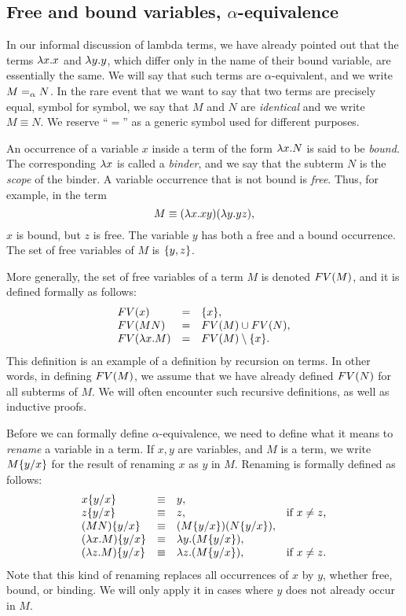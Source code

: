 \documentclass{article}
\begin{document}
\subsection{Free and bound variables, $\alpha$-equivalence}

In our informal discussion of lambda terms, we have already pointed
out that the terms $\lambda x.x$ and $\lambda y.y$, which differ only in the
name of their bound variable, are essentially the same. We will say
that such terms are $\alpha$-equivalent, and we write $M=_{\alpha} N$.  In
the rare event that we want to say that two terms are precisely equal,
symbol for symbol, we say that $M$ and $N$ are {\em identical} and we
write $M\equiv N$. We reserve ``$=$'' as a generic symbol used for
different purposes.

An occurrence of a variable $x$ inside a term of the form $\lambda x.N$
is said to be {\em bound}. The corresponding $\lambda x$ is called a {\em
  binder}, and we say that the subterm $N$ is the {\em scope} of the
binder. A variable occurrence that is not bound is {\em free}.  Thus,
for example, in the term
\[   M \equiv (\lambda x.xy)(\lambda y.yz), \]
$x$ is bound, but $z$ is free. The variable $y$ has both a free and a
bound occurrence. The set of free variables of $M$ is $\{y,z\}$. 

More generally, the set of free variables of a term $M$ is denoted
$FV(M)$, and it is defined formally as follows:
\[ \begin{array}{lll}
  FV(x) &=& \{x\}, \\
  FV(MN) &=& FV(M)\cup FV(N), \\
  FV(\lambda x.M) &=& FV(M) \setminus \{x\}.
\end{array}
\]
This definition is an example of a definition by recursion on
terms. In other words, in defining $FV(M)$, we assume that we have
already defined $FV(N)$ for all subterms of $M$. We will often
encounter such recursive definitions, as well as inductive proofs. 

Before we can formally define $\alpha$-equivalence, we need to define
what it means to {\em rename} a variable in a term. If $x,y$ are
variables, and $M$ is a term, we write $M\{y/x\}$ for the result of
renaming $x$ as $y$ in $M$. Renaming is formally defined as follows:
\[ \begin{array}{llll}
  x\{y/x\} &\equiv& y, \\
  z\{y/x\} &\equiv& z, & \mbox{if $x\neq z$,} \\
  (MN)\{y/x\} &\equiv& (M\{y/x\})(N\{y/x\}), \\
  (\lambda x.M)\{y/x\} &\equiv& \lambda y.(M\{y/x\}), \\
  (\lambda z.M)\{y/x\} &\equiv& \lambda z.(M\{y/x\}), & \mbox{if
  $x\neq z$.}
\end{array}
\]
Note that this kind of renaming replaces all occurrences of $x$ by
$y$, whether free, bound, or binding. We will only apply it in cases
where $y$ does not already occur in $M$. 
\end{document}

